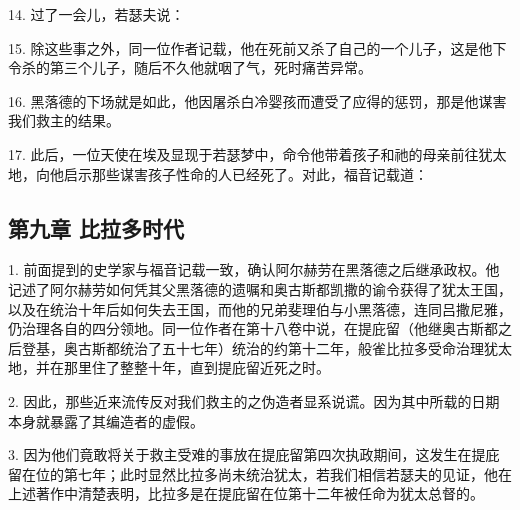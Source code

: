 14. 过了一会儿，若瑟夫说：\par

15. 除这些事之外，同一位作者记载，他在死前又杀了自己的一个儿子，这是他下令杀的第三个儿子，随后不久他就咽了气，死时痛苦异常。\par

16. 黑落德的下场就是如此，他因屠杀白冷婴孩而遭受了应得的惩罚，那是他谋害我们救主的结果。\par

17. 此后，一位天使在埃及显现于若瑟梦中，命令他带着孩子和祂的母亲前往犹太地，向他启示那些谋害孩子性命的人已经死了。对此，福音记载道：\par


\subsection{第九章 比拉多时代}

1. 前面提到的史学家与福音记载一致，确认阿尔赫劳在黑落德之后继承政权。他记述了阿尔赫劳如何凭其父黑落德的遗嘱和奥古斯都凯撒的谕令获得了犹太王国，以及在统治十年后如何失去王国，而他的兄弟斐理伯与小黑落德，连同吕撒尼雅，仍治理各自的四分领地。同一位作者在第十八卷中说，在提庇留（他继奥古斯都之后登基，奥古斯都统治了五十七年）统治的约第十二年，般雀比拉多受命治理犹太地，并在那里住了整整十年，直到提庇留近死之时。\par

2. 因此，那些近来流传反对我们救主的之伪造者显系说谎。因为其中所载的日期本身就暴露了其编造者的虚假。\par

3. 因为他们竟敢将关于救主受难的事放在提庇留第四次执政期间，这发生在提庇留在位的第七年；此时显然比拉多尚未统治犹太，若我们相信若瑟夫的见证，他在上述著作中清楚表明，比拉多是在提庇留在位第十二年被任命为犹太总督的。\par


\subsection{}

